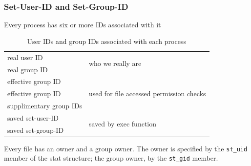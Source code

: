 \documentclass[newPxFont,sthlmFooter,nooffset]{beamer}
\begin{document}
\begin{frame}
  \frametitle{Set-User-ID and Set-Group-ID}
Every process has six or more IDs associated with it
  \begin{table}[h]
    \centering
    \begin{tabular}{l | l}
     real user ID & \multirow{2}{*}{who we really are} \\
     real group ID & \\ \hline
     effective group ID & \multirow{3}{*}{used for file accessed permission checks} \\
     effective group ID & \\
     supplimentary group IDs & \\ \hline
     saved set-user-ID & \multirow{2}{*}{saved by exec function} \\
     saved set-group-ID & \\
    \end{tabular}
    \caption{User IDs and group IDs associated with each process}
    \label{tab:uid_gid}
  \end{table}
Every file has an owner and a group owner. The owner is specified by the \texttt{st\_uid} member of the stat structure; the group owner, by the \texttt{st\_gid} member.
\end{frame}
\end{document}
